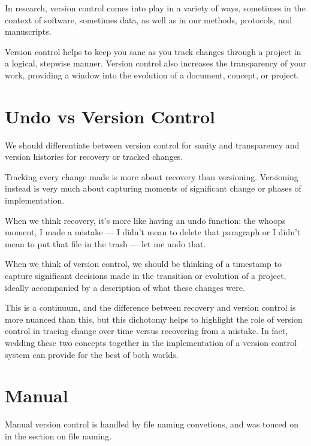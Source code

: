 \documentclass[
]{book}
\begin{document}
In research, version control comes into play in a variety of ways, sometimes in the context of software, sometimes data, as well as in our methods, protocols, and manuscripts.

Version control helps to keep you sane as you track changes through a project in a logical, stepwise manner. Version control also increases the transparency of your work, providing a window into the evolution of a document, concept, or project.

\hypertarget{undo-vs-version-control}{%
\section*{Undo vs Version Control}\label{undo-vs-version-control}}

We should differentiate between version control for sanity and transparency and version histories for recovery or tracked changes.

Tracking every change made is more about recovery than versioning. Versioning instead is very much about capturing moments of significant change or phases of implementation.

When we think recovery, it's more like having an undo function: the whoops moment, I made a mistake --- I didn't mean to delete that paragraph or I didn't mean to put that file in the trash --- let me undo that.

When we think of version control, we should be thinking of a timestamp to capture significant decisions made in the transition or evolution of a project, ideally accompanied by a description of what these changes were.

This is a continuum, and the difference between recovery and version control is more nuanced than this, but this dichotomy helps to highlight the role of version control in tracing change over time versus recovering from a mistake. In fact, wedding these two concepts together in the implementation of a version control system can provide for the best of both worlds.

\hypertarget{manual}{%
\section*{Manual}\label{manual}}

Manual version control is handled by file naming convetions, and was touced on in the section on file naming.
\end{document}
